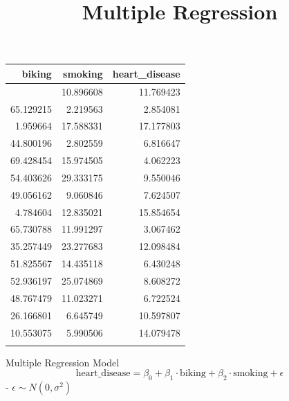 \documentclass[
  ignorenonframetext,
]{beamer}
\title{Multiple Regression}
\author{}
\date{}
\begin{document}
\frame{\titlepage}
\ifdefined\Shaded\renewenvironment{Shaded}{\begin{tcolorbox}[interior hidden, borderline west={3pt}{0pt}{shadecolor}, sharp corners, enhanced, breakable, frame hidden, boxrule=0pt]}{\end{tcolorbox}}\fi

\begin{frame}{}
\protect\hypertarget{section}{}
\begin{longtable}[]{@{}rrr@{}}
\toprule\noalign{}
biking & smoking & heart\_disease \\
\midrule\noalign{}
\endhead
30.801246 & 10.896608 & 11.769423 \\
65.129215 & 2.219563 & 2.854081 \\
1.959664 & 17.588331 & 17.177803 \\
44.800196 & 2.802559 & 6.816647 \\
69.428454 & 15.974505 & 4.062223 \\
54.403626 & 29.333175 & 9.550046 \\
49.056162 & 9.060846 & 7.624507 \\
4.784604 & 12.835021 & 15.854654 \\
65.730788 & 11.991297 & 3.067462 \\
35.257449 & 23.277683 & 12.098484 \\
51.825567 & 14.435118 & 6.430248 \\
52.936197 & 25.074869 & 8.608272 \\
48.767479 & 11.023271 & 6.722524 \\
26.166801 & 6.645749 & 10.597807 \\
10.553075 & 5.990506 & 14.079478 \\
\bottomrule\noalign{}
\end{longtable}
\end{frame}

\begin{frame}{Multiple Regression Model}
\protect\hypertarget{multiple-regression-model}{}
\[
\text{heart_disease} = \beta_0 + \beta_1\cdot \text{biking} + \beta_2\cdot \text{smoking} + \epsilon
\] - \(\epsilon \sim N(0, \sigma^2)\)
\end{frame}
\end{document}
